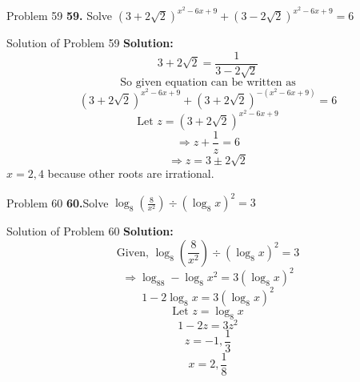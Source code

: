 \documentclass[aspectratio=1610,8pt]{beamer}
\begin{document}
\begin{frame}{Problem 59}
  \textbf{59.} Solve $(3 + 2\sqrt{2})^{x^2 - 6x + 9} + (3 - 2\sqrt{2})^{x^2 - 6x + 9} = 6$
\end{frame}
\begin{frame}{Solution of Problem 59}
  \textbf{Solution:} $$3 + 2\sqrt{2} = \frac{1}{3 - 2\sqrt{2}}$$
  $$\text{So given equation can be written as}$$
  $$(3 + 2\sqrt{2})^{x^2 - 6x + 9} + (3 + 2\sqrt{2})^{-(x^2 - 6x + 9)} = 6$$
  $$\text{Let~} z= (3 + 2\sqrt{2})^{x^2 - 6x + 9}$$
  $$\Rightarrow z + \frac{1}{z} = 6$$
  $$\Rightarrow z = 3\pm2\sqrt{2}$$
  $x = 2, 4$ because other roots are irrational.
\end{frame}
\begin{frame}{Problem 60}
  \textbf{60.}Solve $\log_8\left(\frac{8}{x^2}\right)\div (\log_8x)^2 = 3$
\end{frame}
\begin{frame}{Solution of Problem 60}
  \textbf{Solution:} $$\text{Given,~}\log_8\left(\frac{8}{x^2}\right)\div (\log_8x)^2 = 3$$
  $$\Rightarrow \log_88 - \log_8x^2 = 3(\log_8x)^2$$
  $$1 - 2\log_8x = 3(\log_8x)^2$$
  $$\text{Let~}z = \log_8x$$
  $$1 - 2z = 3z^2$$
  $$z = -1, \frac{1}{3}$$
  $$x = 2, \frac{1}{8}$$
\end{frame}
\end{document}
